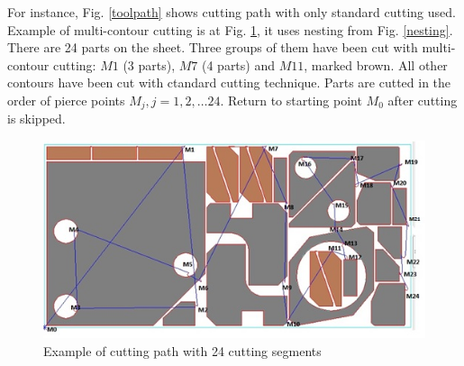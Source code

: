 \documentclass{../download/tPRS2e}
\begin{document}
For instance, Fig. \ref{toolpath}
shows cutting path with only
standard cutting used.
Example of multi-contour cutting is at
Fig. \ref{cutting},
it uses nesting from Fig. \ref{nesting}.
There are 24 parts on the sheet.
Three groups of them have been cut with multi-contour cutting:
$M1$ (3 parts),
$M7$ (4 parts) and
$M11$,
marked brown.
All other contours have been cut
with ctandard cutting technique.
Parts are cutted in the order of
pierce points $M_j, j=1, 2, \dots 24$.
Return to starting point $M_0$
after cutting is skipped.

\begin{figure}
    \begin{center}
    \includegraphics{cutting.png}
    \caption{Example of cutting path with 24 cutting segments} \label{cutting}
    \end{center}
\end{figure}
\end{document}

